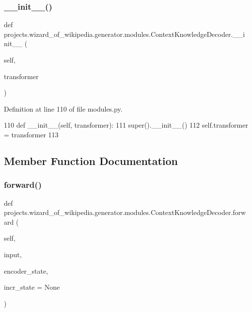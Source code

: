 \subsubsection{\texorpdfstring{\+\_\+\+\_\+init\+\_\+\+\_\+()}{\_\_init\_\_()}}
{\footnotesize\ttfamily def projects.\+wizard\+\_\+of\+\_\+wikipedia.\+generator.\+modules.\+Context\+Knowledge\+Decoder.\+\_\+\+\_\+init\+\_\+\+\_\+ (\begin{DoxyParamCaption}\item[{}]{self,  }\item[{}]{transformer }\end{DoxyParamCaption})}



Definition at line 110 of file modules.\+py.


\begin{DoxyCode}
110     \textcolor{keyword}{def }\_\_init\_\_(self, transformer):
111         super().\_\_init\_\_()
112         self.transformer = transformer
113 
\end{DoxyCode}


\subsection{Member Function Documentation}
\mbox{\label{classprojects_1_1wizard__of__wikipedia_1_1generator_1_1modules_1_1ContextKnowledgeDecoder_ae03a16501c3035669816ceb5eb8678f7}} 
\subsubsection{\texorpdfstring{forward()}{forward()}}
{\footnotesize\ttfamily def projects.\+wizard\+\_\+of\+\_\+wikipedia.\+generator.\+modules.\+Context\+Knowledge\+Decoder.\+forward (\begin{DoxyParamCaption}\item[{}]{self,  }\item[{}]{input,  }\item[{}]{encoder\+\_\+state,  }\item[{}]{incr\+\_\+state = {\ttfamily None} }\end{DoxyParamCaption})}




